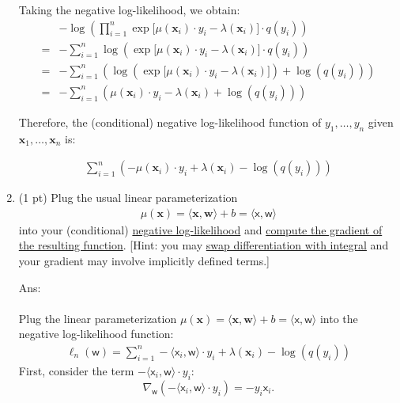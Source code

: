 \documentclass[10pt]{article}
\newcommand{\wv}{\mathbf{w}}
\newcommand{\xv}{\mathbf{x}}
\newcommand{\inner}[2]{\langle #1, #2 \rangle}
\newcommand{\xbs}{\bm{\mathsf{x}}}
\newcommand{\wbs}{\bm{\mathsf{w}}}
\newcommand{\ans}[1]{{\color{orange}\textsf{Ans}: #1}}
\begin{document}
\begin{exercise}
\begin{enumerate}
          Taking the negative log-likelihood, we obtain:
          \begin{equation*}
            \begin{aligned}
                & -\log \left( \prod_{i=1}^n \exp\Big[ \mu(\xv_i) \cdot y_i - \lambda(\xv_i) \Big] \cdot q(y_i) \right)                 \\
              = & -\sum_{i=1}^n \log \left( \exp\Big[ \mu(\xv_i) \cdot y_i - \lambda(\xv_i) \Big] \cdot q(y_i) \right)                  \\
              = & -\sum_{i=1}^n \left( \log \left( \exp\Big[ \mu(\xv_i) \cdot y_i - \lambda(\xv_i) \Big] \right) + \log(q(y_i)) \right) \\
              = & -\sum_{i=1}^n \left( \mu(\xv_i) \cdot y_i - \lambda(\xv_i) + \log(q(y_i)) \right)
            \end{aligned}
          \end{equation*}

          Therefore, the (conditional) negative log-likelihood function of $y_1, \ldots, y_n$ given $\xv_1, \ldots, \xv_n$ is:

          \begin{align}
            \boxed{ \sum_{i=1}^n (-\mu(\xv_i) \cdot y_i + \lambda(\xv_i)  - \log(q(y_i))) }
          \end{align}
          \newpage
    \item (1 pt) Plug the usual linear parameterization
          \begin{align}
            \mu(\xv) = \inner{\xv}{\wv} + b = \inner{\xbs}{\wbs}
          \end{align}
          into your (conditional) \uline{negative log-likelihood} and \uline{compute the gradient of the resulting function}. [Hint: you may \href{https://en.wikipedia.org/wiki/Leibniz_integral_rule}{swap differentiation with integral} and your gradient may involve implicitly defined terms.]

          \ans\\
          \leavevmode\\
          Plug the linear parameterization $\mu(\xv) = \inner{\xv}{\wv} + b = \inner{\xbs}{\wbs}$ into the negative log-likelihood function:
          \begin{align}
            \boxed{\ell_n(\wbs) = \sum_{i=1}^n -\inner{\xbs_i}{\wbs} \cdot y_i + \lambda(\xv_i)  - \log(q(y_i))}
          \end{align}
          First, consider the term $-\inner{\xbs_i}{\wbs} \cdot y_i$:
          $$
            \nabla_{\wbs} \left( -\inner{\xbs_i}{\wbs} \cdot y_i \right) = -y_i \xbs_i.
          $$


\end{enumerate}
\end{exercise}
\end{document}
